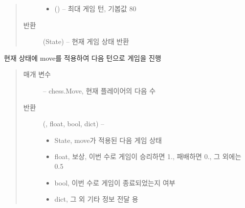 \documentclass[letterpaper,10pt,english]{sphinxmanual}
\begin{document}
\begin{fulllineitems}
\begin{fulllineitems}
\begin{quote}
\begin{description}
\begin{itemize}
\item {} 
 () -- 최대 게임 턴, 기봅값 80

\end{itemize}

\item[{반환}] \leavevmode
(State) -- 현재 게임 상태 반환

\end{description}\end{quote}

\end{fulllineitems}


\begin{fulllineitems}
\label{\detokenize{scripts:scripts.run_game.Environment.step}}
현재 상태에 move를 적용하여 다음 턴으로 게임을 진행
\begin{quote}\begin{description}
\item[{매개 변수}] \leavevmode
{} -- chess.Move, 현재 플레이어의 다음 수

\item[{반환}] \leavevmode

({\hyperref[\detokenize{scripts:scripts.run_game.State}]{}}, float, bool, dict) --
\begin{itemize}
\item {} 
State, move가 적용된 다음 게임 상태

\item {} 
float, 보상, 이번 수로 게임이 승리하면 1., 패배하면 0., 그 외에는 0.5

\item {} 
bool, 이번 수로 게임이 종료되었는지 여부

\item {} 
dict, 그 외 기타 정보 전달 용

\end{itemize}


\end{description}\end{quote}

\end{fulllineitems}


\end{fulllineitems}
\end{document}
